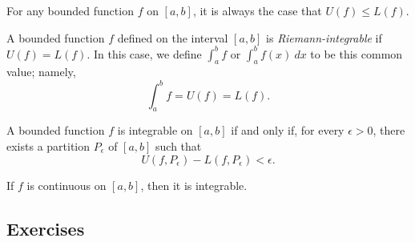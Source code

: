 \begin{tcolorbox}
\begin{lem}
	For any bounded function \( f  \) on \( [a,b]  \), it is always the case that \( U(f) \leq L(f) \).
\end{lem}
\end{tcolorbox}


\begin{tcolorbox}
	\begin{defn}
	A bounded function \( f  \) defined on the interval \( [a,b] \) is \textit{Riemann-integrable} if \( U(f) = L(f) \). In this case, we define \( \int_{ a }^{ b } f   \) or \( \int_{ a }^{ b } f(x) \ dx \) to be this common value; namely, 
	\[  \int_{ a }^{ b } f  = U(f) = L(f). \]
	\end{defn}
\end{tcolorbox}


\begin{tcolorbox}
	\begin{thm}
		A bounded function \(  f \) is integrable on \( [a,b]  \) if and only if, for every \( \epsilon > 0  \), there exists a partition \( P_{\epsilon } \) of \( [a,b] \) such that 
		\[  U(f, P_{\epsilon }) - L(f, P_{\epsilon }) < \epsilon. \]
	\end{thm}
\end{tcolorbox}


\begin{tcolorbox}
\begin{thm}
	If \( f  \) is continuous on \( [a,b] \), then it is integrable.
\end{thm}
\end{tcolorbox}




\subsection{Exercises}







